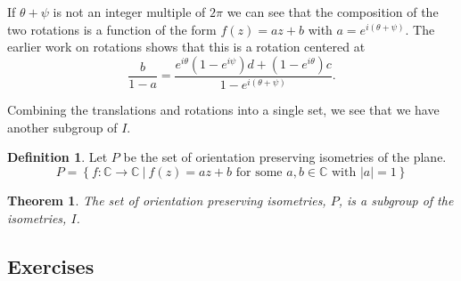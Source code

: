 \documentclass[
]{book}
\newtheorem{theorem}{Theorem}[chapter]
\theoremstyle{definition}
\newtheorem{definition}{Definition}[chapter]
\theoremstyle{definition}
\theoremstyle{definition}
\theoremstyle{definition}
\theoremstyle{remark}
\begin{document}
If \(\theta+\psi\) is not an integer multiple of \(2\pi\) we can see that the composition of the two rotations is a function of the form \(f(z)=az+b\) with \(a=e^{i(\theta+\psi)}\). The earlier work on rotations shows that this is a rotation centered at \[\frac{b}{1-a} = \frac{e^{i\theta} \left(1-e^{i\psi}\right) d + (1-e^{i\theta}) c}{1-e^{i(\theta+\psi)}}.\]

Combining the translations and rotations into a single set, we see that we have another subgroup of \(I\).

\begin{definition}
Let \(P\) be the set of orientation preserving isometries of the plane. \[P = \left\{ f: \mathbb{C} \rightarrow \mathbb{C} \: \vert \:  f(z)=a z+b  \mbox{ for some } a, b \in \mathbb{C} \mbox{ with } |a|=1 \right\}\]
\end{definition}

\begin{theorem}
The set of orientation preserving isometries, \(P\), is a subgroup of the isometries, \(I\).
\end{theorem}

\hypertarget{exercises-54}{%
\subsection{Exercises}\label{exercises-54}}
\end{document}
